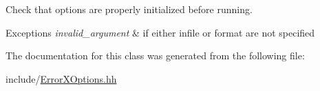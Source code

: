 Check that options are properly initialized before running.


\begin{DoxyExceptions}{Exceptions}
{\em invalid\+\_\+argument} & if either infile or format are not specified \\
\hline
\end{DoxyExceptions}


The documentation for this class was generated from the following file\+:\begin{DoxyCompactItemize}
\item 
include/\mbox{\hyperlink{_error_x_options_8hh}{Error\+X\+Options.\+hh}}\end{DoxyCompactItemize}
